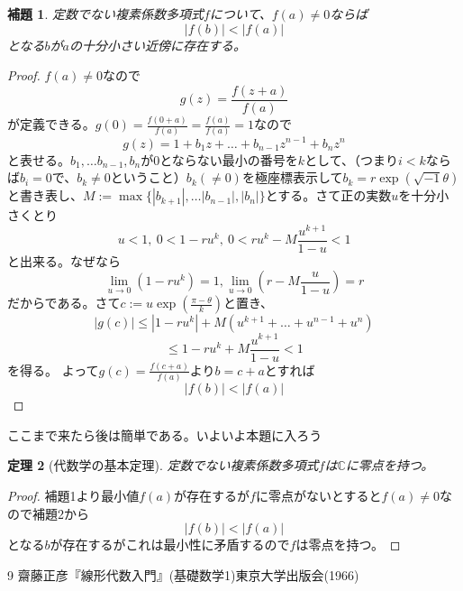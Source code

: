 \documentclass{jsarticle}
\newtheorem{theorem}{定理}
\newtheorem{lemma}[theorem]{補題}
\newcommand{\cc}{\mathbb{C}}
\begin{document}
\begin{lemma}定数でない複素係数多項式$f$について、$f(a)\neq0$ならば
\[
|f(b)|<|f(a)|
\]
となる$b$が$a$の十分小さい近傍に存在する。
\end{lemma}
\begin{proof}$f(a)\neq0$なので
\[
g(z)=\frac{f(z+a)}{f(a)}
\]
が定義できる。$\displaystyle g(0)=\frac{f(0+a)}{f(a)}=\frac{f(a)}{f(a)}=1$なので
\[
g(z)=1+b_1z+\dots + b_{n-1}z^{n-1}+b_nz^n
\]
と表せる。$b_1, \dots b_{n-1},b_n$が$0$とならない最小の番号を$k$として、（つまり$i<k$ならば$b_i=0$で、$b_k\neq0$ということ）$b_k(\neq 0)$を極座標表示して$b_k=r\exp(\sqrt{-1}\theta)$と書き表し、$M:=\max\{|b_{k+1}|,\dots|b_{n-1}|,|b_n|\}$とする。さて正の実数$u$を十分小さくとり
\[
u<1,\ 0<1-ru^k,\ 0<ru^k-M\frac{u^{k+1}}{1-u}<1
\]と出来る。なぜなら
\[
\lim_{u\rightarrow 0}(1-ru^k)=1, \lim_{u\rightarrow 0}(r-M\frac{u}{1-u})=r
\]
だからである。さて$\displaystyle c:=u\exp(\frac{\pi-\theta}{k})$と置き、
\[
|g(c)|\le |1-ru^k|+M(u^{k+1}+\dots +u^{n-1}+u^{n})
\]
\[
\le1-ru^k+M\frac{u^{k+1}}{1-u}<1
\]
を得る。
よって$\displaystyle g(c)=\frac{f(c+a)}{f(a)}$より$b=c+a$とすれば
\[
|f(b)|<|f(a)|
\]
\end{proof}
ここまで来たら後は簡単である。いよいよ本題に入ろう
\begin{theorem}[代数学の基本定理]定数でない複素係数多項式$f$は$\cc$に零点を持つ。
\end{theorem}
\begin{proof}補題1より最小値$f(a)$が存在するが$f$に零点がないとすると$f(a)\neq0$なので補題2から
\[
|f(b)|<|f(a)|
\]
となる$b$が存在するがこれは最小性に矛盾するので$f$は零点を持つ。	
\end{proof}
\begin{thebibliography}{9}
齋藤正彦『線形代数入門』(基礎数学1)東京大学出版会(1966)
\end{thebibliography}
\end{document}
